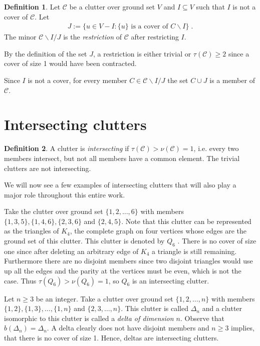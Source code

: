 \documentclass[a4paper, 12pt, twoside=false]{scrbook}
\theoremstyle{definition}
\newtheorem*{definition}{Definition}
\begin{document}
\begin{definition}
    Let $\mathcal{C}$ be a clutter over ground set $V$ and $I \subseteq V$ such that $I$ is not a cover of $\mathcal{C}$.
    Let
    \begin{align*}
        J := \{u \in V-I : \{u\} \text{ is a cover of } C\backslash I\} \;.
    \end{align*}
    The minor $\mathcal{C} \backslash I / J$ is the \emph{restriction} of $\mathcal{C}$ after restricting $I$.
\end{definition}

By the definition of the set $J$, a restriction is either trivial or $\tau(\mathcal{C}) \geq 2$ since a cover of size 1 would have been contracted.

Since $I$ is not a cover, for every member $C \in \mathcal{C} \backslash I /J$ the set $C \cup J$ is a member of $\mathcal{C}$.

\section{Intersecting clutters}
\begin{definition}
    A clutter is \emph{intersecting} if $\tau(\mathcal{C}) > \nu(\mathcal{C}) = 1$, i.e. every two members intersect, but not all members have a common element.
    The trivial clutters are not intersecting.
\end{definition}
We will now see a few examples of intersecting clutters that will also play a major role throughout this entire work.

Take the clutter over ground set $\{1,2,\ldots,6\}$ with members $\{1,3,5\}, \{1,4,6\}, \{2,3,6\}$ and $\{2,4,5\}$.
Note that this clutter can be represented as the triangles of $K_4$, the complete graph on four vertices whose edges are the ground set of this clutter.
This clutter is denoted by $Q_6$ \cite{q6}.
There is no cover of size one since after deleting an arbitrary edge of $K_4$ a triangle is still remaining.
Furthermore there are no disjoint members since two disjoint triangles would use up all the edges and the parity at the vertices must be even, which is not the case.
Thus $\tau(Q_6) > \nu(Q_6) = 1$, so $Q_6$ is an intersecting clutter.

Let $n \geq 3$ be an integer.
Take a clutter over ground set $\{1,2,\ldots,n\}$ with members $\{1,2\},\{1,3\},\ldots,\{1,n\}$ and $\{2,3,\ldots,n\}$.
This clutter is called $\Delta_n$ and a clutter isomorphic to this clutter is called a \emph{delta of dimension $n$}\cite{deltadefinition}.
Observe that $b(\Delta_n)=\Delta_n$.
A delta clearly does not have disjoint members and $n\geq 3$ implies, that there is no cover of size 1.
Hence, deltas are intersecting clutters.
\end{document}

